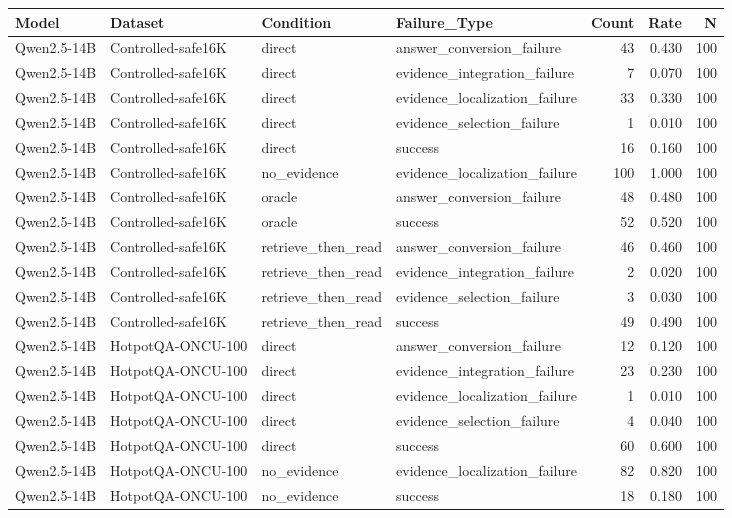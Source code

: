 \begin{tabular}{llllrrr}
\toprule
Model & Dataset & Condition & Failure_Type & Count & Rate & N \\
\midrule
Qwen2.5-14B & Controlled-safe16K & direct & answer_conversion_failure & 43 & 0.430 & 100 \\
Qwen2.5-14B & Controlled-safe16K & direct & evidence_integration_failure & 7 & 0.070 & 100 \\
Qwen2.5-14B & Controlled-safe16K & direct & evidence_localization_failure & 33 & 0.330 & 100 \\
Qwen2.5-14B & Controlled-safe16K & direct & evidence_selection_failure & 1 & 0.010 & 100 \\
Qwen2.5-14B & Controlled-safe16K & direct & success & 16 & 0.160 & 100 \\
Qwen2.5-14B & Controlled-safe16K & no_evidence & evidence_localization_failure & 100 & 1.000 & 100 \\
Qwen2.5-14B & Controlled-safe16K & oracle & answer_conversion_failure & 48 & 0.480 & 100 \\
Qwen2.5-14B & Controlled-safe16K & oracle & success & 52 & 0.520 & 100 \\
Qwen2.5-14B & Controlled-safe16K & retrieve_then_read & answer_conversion_failure & 46 & 0.460 & 100 \\
Qwen2.5-14B & Controlled-safe16K & retrieve_then_read & evidence_integration_failure & 2 & 0.020 & 100 \\
Qwen2.5-14B & Controlled-safe16K & retrieve_then_read & evidence_selection_failure & 3 & 0.030 & 100 \\
Qwen2.5-14B & Controlled-safe16K & retrieve_then_read & success & 49 & 0.490 & 100 \\
Qwen2.5-14B & HotpotQA-ONCU-100 & direct & answer_conversion_failure & 12 & 0.120 & 100 \\
Qwen2.5-14B & HotpotQA-ONCU-100 & direct & evidence_integration_failure & 23 & 0.230 & 100 \\
Qwen2.5-14B & HotpotQA-ONCU-100 & direct & evidence_localization_failure & 1 & 0.010 & 100 \\
Qwen2.5-14B & HotpotQA-ONCU-100 & direct & evidence_selection_failure & 4 & 0.040 & 100 \\
Qwen2.5-14B & HotpotQA-ONCU-100 & direct & success & 60 & 0.600 & 100 \\
Qwen2.5-14B & HotpotQA-ONCU-100 & no_evidence & evidence_localization_failure & 82 & 0.820 & 100 \\
Qwen2.5-14B & HotpotQA-ONCU-100 & no_evidence & success & 18 & 0.180 & 100 \\

\end{tabular}
